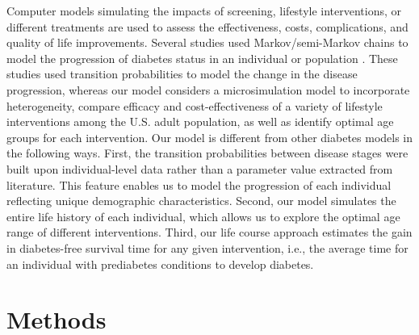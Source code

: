\documentclass[fleqn,10pt]{wlscirep}
\begin{document}
Computer models simulating the impacts of screening, lifestyle interventions, or different treatments are used to assess the effectiveness, costs, complications, and quality of life improvements. Several studies used Markov/semi-Markov chains to model the progression of diabetes status in an individual or population \cite{huang2009projecting,zhuo:lifetime:2013,seuring2015economic,leal2017computer}. These studies used transition probabilities to model the change in the disease progression, whereas our model considers a microsimulation model to incorporate heterogeneity, compare efficacy and cost-effectiveness of a variety of lifestyle interventions among the U.S. adult population, as well as identify optimal age groups for each intervention. Our model is different from other diabetes models in the following ways. First, the transition probabilities between disease stages were built upon individual-level data rather than a parameter value extracted from literature. This feature enables us to model the progression of each individual reflecting unique demographic characteristics. Second, our model simulates the entire life history of each individual, which allows us to explore the optimal age range of different interventions. Third, our life course approach estimates the gain in diabetes-free survival time for any given intervention, i.e., the average time for an individual with prediabetes conditions to develop diabetes.


\section*{Methods}
\end{document}
